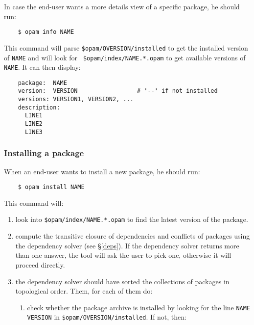 \documentclass[a4paper,11pt]{article}
\begin{document}
\begin{itemize}
In case the end-user wants a more details view of a specific package,
he should run:

\begin{verbatim}
    $ opam info NAME
\end{verbatim}

This command will parse {\tt \$opam/OVERSION/installed} to get the
installed version of {\tt NAME} and will look for {\tt
  \$opam/index/NAME.*.opam} to get available versions of {\tt
  NAME}. It can then display:

\begin{verbatim}
    package:  NAME
    version:  VERSION                 # '--' if not installed
    versions: VERSION1, VERSION2, ...
    description:
      LINE1
      LINE2
      LINE3
\end{verbatim}

\subsubsection{Installing a package}
\label{install}

When an end-user wants to install a new package, he should run:

\begin{verbatim}
    $ opam install NAME
\end{verbatim}

This command will:

\begin{enumerate}

\item look into {\tt \$opam/index/NAME.*.opam} to find the latest
  version of the package.

\item compute the transitive closure of dependencies and conflicts of
  packages using the dependency solver (see \S\ref{deps}). If the
  dependency solver returns more than one answer, the tool will ask
  the user to pick one, otherwise it will proceed directly.

\item the dependency solver should have sorted the collections of
  packages in topological order. Them, for each of them do:

\begin{enumerate}

\item check whether the package archive is installed by looking for
  the line {\tt NAME VERSION} in {\tt \$opam/OVERSION/installed}. If
  not, then:


\end{enumerate}
\end{enumerate}
\end{itemize}
\end{document}
